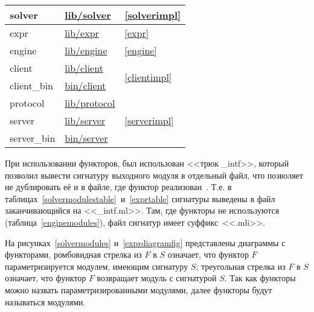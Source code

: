 \begin{centering}
\begin{longtable}{|l|l|l|}
        solver                                                    & \href{https://github.com/prekel/chapgame/blob/master/lib/solver}{lib/solver}     & \ref{solverimpl}                        \\ \hline
        expr                                                      & \href{https://github.com/prekel/chapgame/blob/master/lib/expr}{lib/expr}         & \ref{expr}                              \\ \hline
        engine                                                    & \href{https://github.com/prekel/chapgame/blob/master/lib/engine}{lib/engine}     & \ref{engine}                            \\ \hline
        client                                                    & \href{https://github.com/prekel/chapgame/blob/master/lib/client}{lib/client}     & \multirow{2}{*}{\ref{clientimpl}}       \\*
        client\_bin                                               & \href{https://github.com/prekel/chapgame/blob/master/bin/client}{bin/client}     &                                         \\ \hline
        protocol                                                  & \href{https://github.com/prekel/chapgame/blob/master/lib/protocol}{lib/protocol} & \multirow{3}{*}{\ref{serverimpl}}       \\ \cline{1-2}
        server                                                    & \href{https://github.com/prekel/chapgame/blob/master/lib/server}{lib/server}     &                                         \\*
        server\_bin                                               & \href{https://github.com/prekel/chapgame/blob/master/bin/server}{bin/server}     &                                         \\ \hline
    \end{longtable}
\end{centering}

При использовании функторов, был использован <<трюк \_intf>>, который позволил вывести сигнатуру выходного модуля
в отдельный файл, что позволяет не дублировать её и в файле, где функтор реализован~\cite{intftrick}.
Т.е. в таблицах~\ref{solvermodulestable}~и~\ref{exprtable} сигнатуры выведены в файл заканчивающийся на <<\_intf.ml>>.
Там, где функторы не используются (таблица~\ref{enginemodules}), файл сигнатур имеет суффикс~<<.mli>>.

На рисунках~\ref{solvermodules} и~\ref{exprdiagramfig} представлены диаграммы с функторами,
ромбовидная стрелка из \(F\) в \(S\) означает, что функтор \(F\) параметризируется модулем, имеющим сигнатуру \(S\);
треугольная стрелка из \(F\) в \(S\) означает, что функтор \(F\) возвращает модуль с сигнатурой \(S\).
Так как функторы можно назвать параметризированными модулями, далее функторы будут называться модулями.

